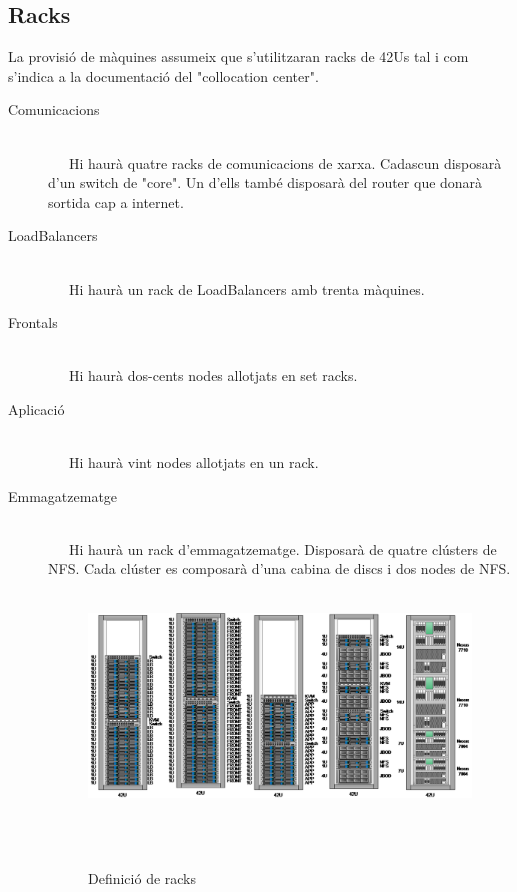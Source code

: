 \documentclass[a4paper, 11pt]{article}
\begin{document}
\subsection{Racks}

La provisió de màquines assumeix que s'utilitzaran racks de 42Us tal i com s'indica a la documentació del "collocation center".

\begin{description}

\item[Comunicacions] \hfill \\ 
    Hi haurà quatre racks de comunicacions de xarxa. Cadascun disposarà d'un switch de "core". Un d'ells també disposarà del router que donarà sortida cap a internet. 
    
\item[LoadBalancers] \hfill \\
    Hi haurà un rack de LoadBalancers amb trenta màquines.

\item[Frontals] \hfill \\
    Hi haurà dos-cents nodes allotjats en set racks.

\item[Aplicació] \hfill \\
    Hi haurà vint nodes allotjats en un rack. 
    
\item[Emmagatzematge] \hfill \\
    Hi haurà un rack d'emmagatzematge. Disposarà de quatre clústers de NFS. Cada clúster es composarà d'una cabina de discs i dos nodes de NFS.

\begin{figure}[H]
    \centering
    \includegraphics[width=1.0\textwidth]{Racks}
    \caption{Definició de racks \label{fig:centralized}}    
\end{figure}


\end{description}
\end{document}
